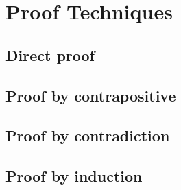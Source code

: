 \documentclass{article}[12pt]
\begin{document}
            
    \section{Proof Techniques}
        
        
        \subsection{Direct proof}
        
        
        \subsection{Proof by contrapositive}
        
        
        \subsection{Proof by contradiction}
            
        \subsection{Proof by induction}
\end{document}
